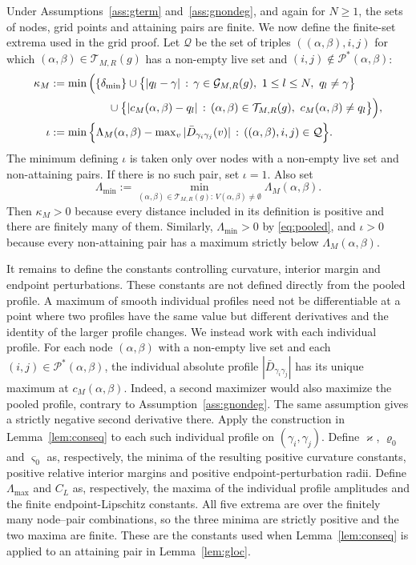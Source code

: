 \documentclass[12pt, a4paper]{article}
\begin{document}
Under Assumptions~\ref{ass:gterm} and~\ref{ass:gnondeg}, and again for
$N \ge 1$, the sets of nodes, grid points and attaining pairs are finite. We
now define the finite-set extrema used in the grid proof. Let $\mathcal Q$ be
the set of triples $((\alpha,\beta),i,j)$ for which
$(\alpha,\beta)\in\mathcal{T}_{M,R}(g)$ has a non-empty live set and
$(i,j)\notin\mathcal{P}^*(\alpha,\beta)$:
\begin{align}
\label{eq:kappaM}
\kappa_M &:= \min\Big( \{\delta_{\min}\} \cup \big\{ |q_l - \gamma| \, : \,
\gamma \in \mathcal{G}_{M,R}(g), \ 1 \le l \le N, \ q_l \ne \gamma \big\}
\notag \\
&\hspace{5.2em} \cup \big\{ |c_M(\alpha,\beta) - q_l| \, : \,
(\alpha,\beta) \in \mathcal{T}_{M,R}(g), \ c_M(\alpha,\beta) \ne q_l \big\}
\Big), \\
\iota &:= \min \Big\{ \Lambda_M(\alpha,\beta) -
\textstyle\max_v |\bar D_{\gamma_i\gamma_j}(v)| \, : \,
((\alpha,\beta),i,j)\in\mathcal Q \Big\} .
\end{align}
The minimum defining $\iota$ is taken only over nodes with a non-empty live
set and non-attaining pairs. If there is no such pair, set $\iota=1$. Also set
\[
\Lambda_{\min}:=
\min_{(\alpha,\beta)\in\mathcal{T}_{M,R}(g):\,V(\alpha,\beta)\ne\emptyset}
\Lambda_M(\alpha,\beta).
\]
Then $\kappa_M>0$ because every distance included in its definition is
positive and there are finitely many of them. Similarly,
$\Lambda_{\min}>0$ by \eqref{eq:pooled}, and $\iota>0$ because every
non-attaining pair has a maximum strictly below $\Lambda_M(\alpha,\beta)$.

It remains to define the constants controlling curvature, interior margin and
endpoint perturbations. These constants are not defined directly from the
pooled profile. A maximum of smooth individual profiles need not be
differentiable at a point where two profiles have the same value but different
derivatives and the identity of the larger profile changes. We instead work
with each individual profile. For each node $(\alpha,\beta)$ with a non-empty
live set and each $(i,j)\in\mathcal{P}^*(\alpha,\beta)$, the individual absolute
profile $|\bar D_{\gamma_i\gamma_j}|$ has its unique maximum at
$c_M(\alpha,\beta)$. Indeed, a second maximizer would also maximize the pooled
profile, contrary to Assumption~\ref{ass:gnondeg}. The same assumption gives a
strictly negative second derivative there. Apply the construction in
Lemma~\ref{lem:conseq} to each such individual profile on
$(\gamma_i,\gamma_j)$. Define $\varkappa$, $\varrho_0$ and $\varsigma_0$ as,
respectively, the minima of the resulting positive curvature constants,
positive relative interior margins and positive endpoint-perturbation radii.
Define $\Lambda_{\max}$ and $C_L$ as, respectively, the maxima of the
individual profile amplitudes and the finite endpoint-Lipschitz constants.
All five extrema are over the finitely many node--pair combinations, so the
three minima are strictly positive and the two maxima are finite. These are
the constants used when Lemma~\ref{lem:conseq} is applied to an attaining pair
in Lemma~\ref{lem:gloc}.
\end{document}
